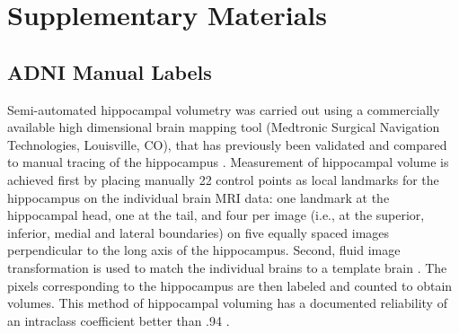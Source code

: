 \documentclass{article}\usepackage{graphicx, color}
\begin{document}

\section{Supplementary Materials}

\subsection{ADNI Manual Labels}
Semi-automated hippocampal volumetry was carried out using a commercially
available high dimensional brain mapping tool (Medtronic Surgical Navigation
Technologies, Louisville, CO), that has previously been validated and compared
to manual tracing of the hippocampus \citep{Hsu2002}. Measurement of hippocampal
volume is achieved first by placing manually 22 control points as local
landmarks for the hippocampus on the individual brain MRI data: one landmark at
the hippocampal head, one at the tail, and four per image (i.e., at the
superior, inferior, medial and lateral boundaries) on five equally spaced images
perpendicular to the long axis of the hippocampus. Second, fluid image
transformation is used to match the individual brains to a template brain
\citep{Christensen1997}. The pixels corresponding to the hippocampus are then
labeled and counted to obtain volumes. This method of hippocampal voluming has a
documented reliability of an intraclass coefficient better than .94
\citep{Hsu2002}.



\end{document}
